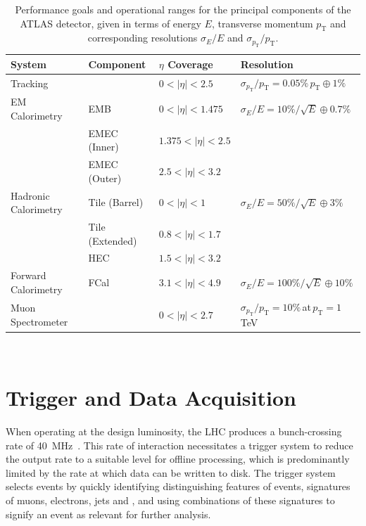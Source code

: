 	  	\begin{table}[ht]
	  		\caption[Performance goals and operational ranges of the ATLAS detector]{Performance goals and operational ranges for the principal components of the ATLAS detector, given in terms of energy $E$, transverse momentum $p_\text{T}$ and corresponding resolutions $\sigma_{E}/E$ and $\sigma_{p_\text{T}}/p_\text{T}$. \cite{ATLAS}}
	  		\label{tab:d:operational}
	  		\medskip
	  		\centering
	  		\begin{tabular}{llll}\toprule
	  			System & Component & $\eta$ Coverage & Resolution \\\midrule
	  			Tracking &  & $0<|\eta|<2.5$ & $\sigma_{p_\text{T}}/p_\text{T} = 0.05\%\,p_\text{T}\oplus1\%$\\
	  			EM Calorimetry & EMB & $0<|\eta|<1.475$ & $\sigma_{E}/E = 10\%/\sqrt{E} \oplus0.7\%$ \\
	  			& EMEC (Inner) & $1.375<|\eta|<2.5$ &  \\
	  			& EMEC (Outer) & $2.5<|\eta|<3.2$ &  \\
	  			Hadronic Calorimetry & Tile (Barrel) & $0<|\eta|<1$ & $\sigma_{E}/E = 50\%/\sqrt{E} \oplus3\%$ \\
	  			& Tile (Extended) & $0.8<|\eta|<1.7$ &  \\
	  			 & HEC & $1.5<|\eta|<3.2$ &  \\
	  			Forward Calorimetry & FCal & $3.1<|\eta|<4.9$ & $\sigma_{E}/E = 100\%/\sqrt{E} \oplus10\%$ \\
	  			Muon Spectrometer &  &  $0<|\eta|<2.7$  & $\sigma_{p_\text{T}}/p_\text{T} = 10\%\,$at$\,p_\text{T}=1$ TeV  \\\bottomrule
	  		\end{tabular}\\[5pt]
	  	\end{table}

\section{Trigger and Data Acquisition}

	When operating at the design luminosity, the LHC produces a bunch-crossing rate of 40~MHz~\cite{trigrun2017}. This rate of interaction necessitates a trigger system to reduce the output rate to a suitable level for offline processing, which is predominantly limited by the rate at which data can be written to disk. The trigger system selects events by quickly identifying distinguishing features of events, signatures of muons, electrons, jets and \bjets, and using combinations of these signatures to signify an event as relevant for further analysis.


